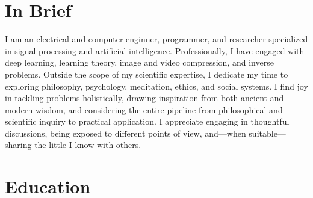 \documentclass[a4paper,11pt]{article}
\begin{document}

  \vspace{15pt}

  \section{In Brief}
    I am an electrical and computer enginner, programmer, and researcher specialized in signal processing and artificial intelligence. Professionally, I have engaged with deep learning, learning theory, image and video compression, and inverse problems. Outside the scope of my scientific expertise, I dedicate my time to exploring philosophy, psychology, meditation, ethics, and social systems. I find joy in tackling problems holistically, drawing inspiration from both ancient and modern wisdom, and considering the entire pipeline from philosophical and scientific inquiry to practical application. I appreciate engaging in thoughtful discussions, being exposed to different points of view, and—when suitable—sharing the little I know with others.


  \vspace{15pt}

  \section{Education}
\end{document}
